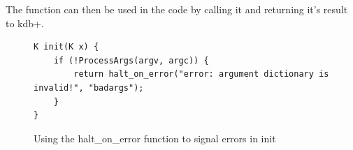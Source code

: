 The function can then be used in the code by calling it and returning it's result to kdb+. 

\begin{figure}
\begin{lstlisting}
K init(K x) {
	if (!ProcessArgs(argv, argc)) {
		return halt_on_error("error: argument dictionary is invalid!", "badargs");
	}
}
\end{lstlisting}
\caption{Using the halt\_on\_error function to signal errors in init}
\end{figure}
